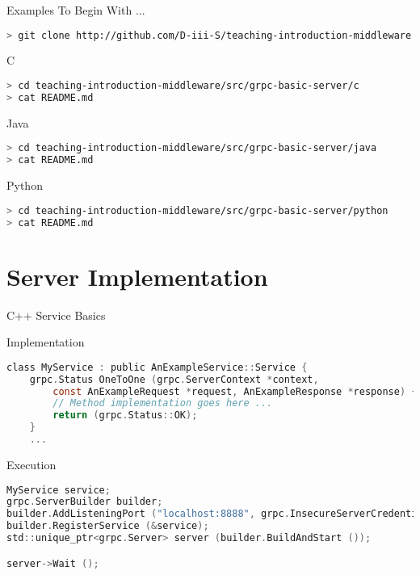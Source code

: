 \begin{frame}[fragile]{Examples To Begin With ...}
\begin{lstlisting}[language=bash,style=mini]
> git clone http://github.com/D-iii-S/teaching-introduction-middleware.git
\end{lstlisting}
    \begin{block}{C}
\begin{lstlisting}[language=bash,style=mini]
> cd teaching-introduction-middleware/src/grpc-basic-server/c
> cat README.md
\end{lstlisting}
    \end{block}
    \begin{block}{Java}
\begin{lstlisting}[language=bash,style=mini]
> cd teaching-introduction-middleware/src/grpc-basic-server/java
> cat README.md
\end{lstlisting}
    \end{block}
    \begin{block}{Python}
\begin{lstlisting}[language=bash,style=mini]
> cd teaching-introduction-middleware/src/grpc-basic-server/python
> cat README.md
\end{lstlisting}
    \end{block}
\end{frame}


\section{Server Implementation}


\begin{frame}[fragile]{C++ Service Basics}
    \begin{block}{Implementation}
\begin{lstlisting}[language=c,style=mini]
class MyService : public AnExampleService::Service {
    grpc.Status OneToOne (grpc.ServerContext *context,
        const AnExampleRequest *request, AnExampleResponse *response) {
        // Method implementation goes here ...
        return (grpc.Status::OK);
    }
    ...
\end{lstlisting}
    \end{block}
    \begin{block}{Execution}
\begin{lstlisting}[language=c,style=mini]
MyService service;
grpc.ServerBuilder builder;
builder.AddListeningPort ("localhost:8888", grpc.InsecureServerCredentials ());
builder.RegisterService (&service);
std::unique_ptr<grpc.Server> server (builder.BuildAndStart ());

server->Wait ();
\end{lstlisting}
    \end{block}
\end{frame}


